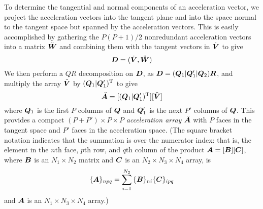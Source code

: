 To determine the tangential and normal components of an acceleration
vector, we project the acceleration vectors into the tangent plane and
into the space normal to the tangent space but spanned by the
acceleration vectors.
This is easily accomplished by gathering the $P ( P + 1 ) / 2 $
nonredundant acceleration vectors into a matrix $\ddot{{\boldsymbol W}}$ and
combining them with the tangent vectors in $\dot {{\boldsymbol V}}$ to give
\begin{equation}
  {\boldsymbol D} = ( \dot{{\boldsymbol V}} , \ddot{{\boldsymbol W}})
  \label{eqn:boldd}
\end{equation}
We then perform a $QR$ decomposition on ${\boldsymbol D}$, as
${\boldsymbol D}=( {\boldsymbol Q}_1 | {\boldsymbol Q} '_1 | {\boldsymbol Q}_2 ) {\boldsymbol R}$,
and multiply the array $\ddot{{\boldsymbol V}}$ by
$( \bQ_1 | \bQ '_1 ) \trans$ to give
\begin{equation}
  \ddot{\bA} = [ ( \bQ_1 | \bQ '_1 ) \trans ] [ \ddot{\bV}]
  \label{eqn:bolda}
\end{equation}
where ${\boldsymbol Q}_1 $ is the first $P$
columns of ${\boldsymbol Q}$ and ${\boldsymbol Q} '_1 $ is the next $P'$ columns of ${\boldsymbol Q}$.
This provides a compact $( P + P' ) \times P \times P$
{\em acceleration array\/} $\ddot{{\boldsymbol A}}$ with $P$ faces in the
tangent space and $P'$ faces in the acceleration space.
(The square bracket notation indicates that the summation is over the
numerator index:
that is, the element in the $n$th face,
$p$th row, and $q$th column of the
product $ {\boldsymbol A} = [ {\boldsymbol B} ][ {\boldsymbol C} ]$, where ${\boldsymbol B}$ is an
$N_1 \times N_{2}$
matrix and ${\boldsymbol C}$ is an $N_2 \times N_3 \times N_{4}$ array, is
\begin{displaymath}
\{ {\boldsymbol A} \}_{npq} = \sum_{i=1}^{ N_2 } { \{ {\boldsymbol B} \}_{ni}
\{ {\boldsymbol C} \}_{ipq} }
\end{displaymath}
and $ {\boldsymbol A} $ is an $N_1 \times N_3 \times N_4 $ array.)

